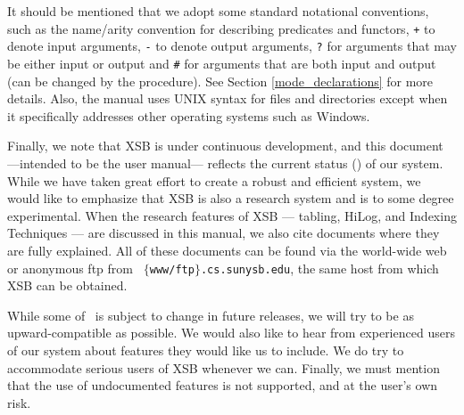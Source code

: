 It should be mentioned that we adopt some standard notational
conventions, such as the name/arity convention for describing
predicates and functors, {\tt +} to denote input arguments, {\tt -} to
denote output arguments, {\tt ?} for arguments that may be either
input or output and {\tt \#} for arguments that are both input and
output (can be changed by the procedure).  See Section
\ref{mode_declarations} for more details.
  Also, the manual uses UNIX syntax for
files and directories except when it specifically addresses other
operating systems such as Windows.  

Finally, we note that XSB is under continuous development, and this
document ---intended to be the user manual--- reflects the current
status (\version) of our system.  While we have taken great effort to
create a robust and efficient system, we would like to emphasize that
XSB is also a research system and is to some degree experimental.
When the research features of XSB --- tabling, HiLog, and Indexing
Techniques --- are discussed in this manual, we also cite documents
where they are fully explained.  All of these documents can be found
via the world-wide web or anonymous ftp from {\tt
$\{$www/ftp$\}$.cs.sunysb.edu}, the same host from which XSB can be
obtained.

While some of \version\ is subject to change in future releases, we
will try to be as upward-compatible as possible. We would also like to
hear from experienced users of our system about features they would
like us to include.  We do try to accommodate serious users of XSB
whenever we can.  Finally, we must mention that the use of
undocumented features is not supported, and at the user's own risk.




